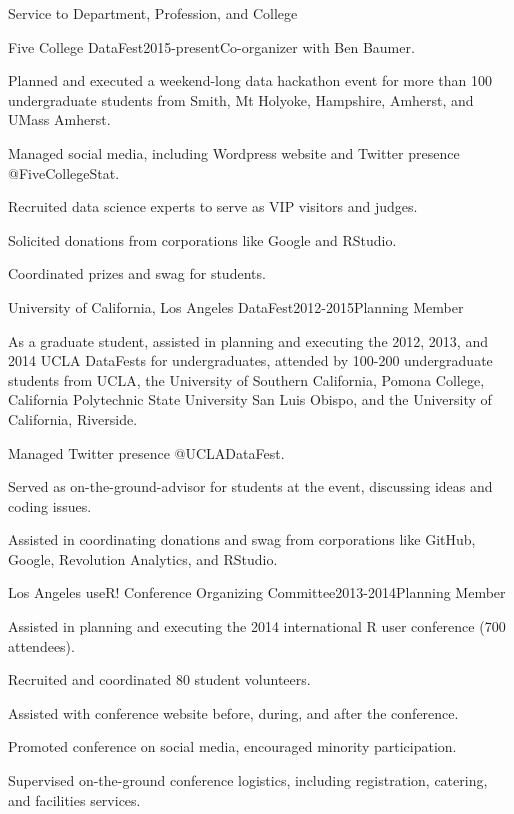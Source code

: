 \documentclass{resume} %
\begin{document}
\begin{rSection}{Service to Department, Profession, and College}
\begin{rSubsection}{Five College DataFest}{}{2015-present}{Co-organizer with Ben Baumer. }
\item Planned and executed a weekend-long data hackathon event for more than 100 undergraduate students from Smith, Mt Holyoke, Hampshire, Amherst, and UMass Amherst. 
\item Managed social media, including Wordpress website and Twitter presence @FiveCollegeStat. 
\item Recruited data science experts to serve as VIP visitors and judges. 
\item Solicited donations from corporations like Google and RStudio. 
\item Coordinated prizes and swag for students. 
\end{rSubsection}
\clearpage
\begin{rSubsection}{University of California, Los Angeles DataFest}{}{2012-2015}{Planning Member}
\item As a graduate student, assisted in planning and executing the 2012, 2013, and 2014 UCLA DataFests for undergraduates, attended by 100-200 undergraduate students from UCLA, the University of Southern California, Pomona College, California Polytechnic State University San Luis Obispo, and the University of California, Riverside. 
\item Managed Twitter presence @UCLADataFest. 
\item Served as on-the-ground-advisor for students at the event, discussing ideas and coding issues. 
\item Assisted in coordinating donations and swag from corporations like GitHub, Google, Revolution Analytics, and RStudio. 
\end{rSubsection}

\begin{rSubsection}{Los Angeles useR! Conference Organizing Committee}{}{2013-2014}{Planning Member}
\item Assisted in planning and executing the 2014 international R user conference (700 attendees).
\item Recruited and coordinated 80 student volunteers.
\item Assisted with conference website before, during, and after the conference.
\item Promoted conference on social media, encouraged minority participation.
\item Supervised on-the-ground conference logistics, including registration, catering, and facilities services. 
\end{rSubsection}


\end{rSection}
\end{document}
